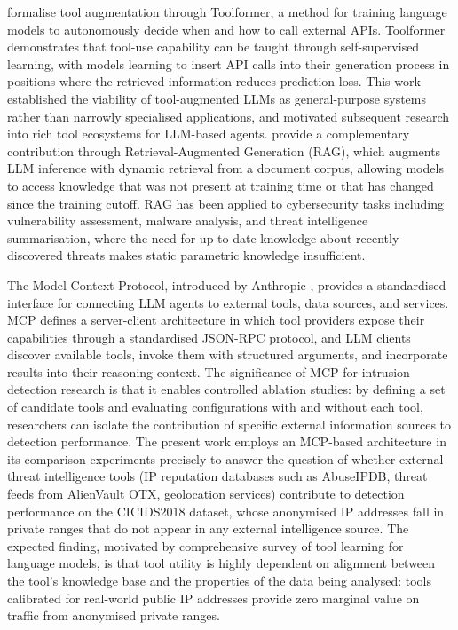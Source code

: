 \textcite{Schick2023} formalise tool augmentation through Toolformer, a method for training language models to autonomously decide when and how to call external APIs. Toolformer demonstrates that tool-use capability can be taught through self-supervised learning, with models learning to insert API calls into their generation process in positions where the retrieved information reduces prediction loss. This work established the viability of tool-augmented LLMs as general-purpose systems rather than narrowly specialised applications, and motivated subsequent research into rich tool ecosystems for LLM-based agents. \textcite{Lewis2020} provide a complementary contribution through Retrieval-Augmented Generation (RAG), which augments LLM inference with dynamic retrieval from a document corpus, allowing models to access knowledge that was not present at training time or that has changed since the training cutoff. RAG has been applied to cybersecurity tasks including vulnerability assessment, malware analysis, and threat intelligence summarisation, where the need for up-to-date knowledge about recently discovered threats makes static parametric knowledge insufficient.

The Model Context Protocol, introduced by Anthropic \autocite{Anthropic2024}, provides a standardised interface for connecting LLM agents to external tools, data sources, and services. MCP defines a server-client architecture in which tool providers expose their capabilities through a standardised JSON-RPC protocol, and LLM clients discover available tools, invoke them with structured arguments, and incorporate results into their reasoning context. The significance of MCP for intrusion detection research is that it enables controlled ablation studies: by defining a set of candidate tools and evaluating configurations with and without each tool, researchers can isolate the contribution of specific external information sources to detection performance. The present work employs an MCP-based architecture in its comparison experiments precisely to answer the question of whether external threat intelligence tools (IP reputation databases such as AbuseIPDB, threat feeds from AlienVault OTX, geolocation services) contribute to detection performance on the CICIDS2018 dataset, whose anonymised IP addresses fall in private ranges that do not appear in any external intelligence source. The expected finding, motivated by \textcite{Qin2024} comprehensive survey of tool learning for language models, is that tool utility is highly dependent on alignment between the tool's knowledge base and the properties of the data being analysed: tools calibrated for real-world public IP addresses provide zero marginal value on traffic from anonymised private ranges.

